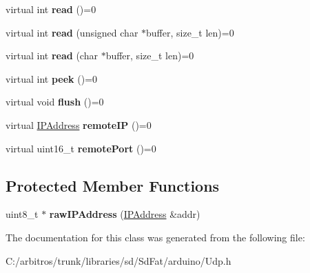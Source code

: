 \begin{DoxyCompactItemize}
\item 
\hypertarget{class_u_d_p_a4afd50731ba321d1b9be909cb288a50b}{virtual int {\bfseries read} ()=0}\label{class_u_d_p_a4afd50731ba321d1b9be909cb288a50b}

\item 
\hypertarget{class_u_d_p_aedff3228c247ac7796279327ee01dc1d}{virtual int {\bfseries read} (unsigned char $\ast$buffer, size\-\_\-t len)=0}\label{class_u_d_p_aedff3228c247ac7796279327ee01dc1d}

\item 
\hypertarget{class_u_d_p_aa421394ec911a19c0f8efc0d755ef1b5}{virtual int {\bfseries read} (char $\ast$buffer, size\-\_\-t len)=0}\label{class_u_d_p_aa421394ec911a19c0f8efc0d755ef1b5}

\item 
\hypertarget{class_u_d_p_a9ae768d427519818aa552adf467bf65a}{virtual int {\bfseries peek} ()=0}\label{class_u_d_p_a9ae768d427519818aa552adf467bf65a}

\item 
\hypertarget{class_u_d_p_a50ab71f4bc571f6e246b20db4b3dd131}{virtual void {\bfseries flush} ()=0}\label{class_u_d_p_a50ab71f4bc571f6e246b20db4b3dd131}

\item 
\hypertarget{class_u_d_p_a9d197907389705fb5e21591f00126782}{virtual \hyperlink{class_i_p_address}{I\-P\-Address} {\bfseries remote\-I\-P} ()=0}\label{class_u_d_p_a9d197907389705fb5e21591f00126782}

\item 
\hypertarget{class_u_d_p_a37084594eca1dabcf5cfd41941aef423}{virtual uint16\-\_\-t {\bfseries remote\-Port} ()=0}\label{class_u_d_p_a37084594eca1dabcf5cfd41941aef423}

\end{DoxyCompactItemize}
\subsection*{Protected Member Functions}
\begin{DoxyCompactItemize}
\item 
\hypertarget{class_u_d_p_a8a60fab7dbb23ddc33ffa5163daa52b5}{uint8\-\_\-t $\ast$ {\bfseries raw\-I\-P\-Address} (\hyperlink{class_i_p_address}{I\-P\-Address} \&addr)}\label{class_u_d_p_a8a60fab7dbb23ddc33ffa5163daa52b5}

\end{DoxyCompactItemize}


The documentation for this class was generated from the following file\-:\begin{DoxyCompactItemize}
\item 
C\-:/arbitros/trunk/libraries/sd/\-Sd\-Fat/arduino/Udp.\-h\end{DoxyCompactItemize}
